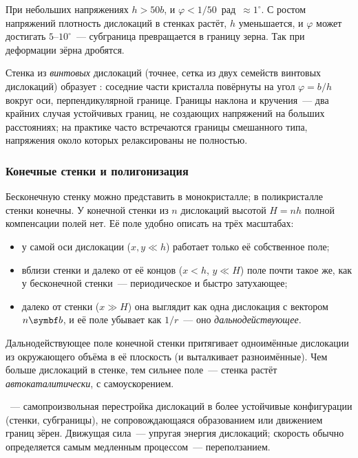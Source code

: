 При небольших напряжениях $h>50b$, и $\varphi<1/50$~рад~$\approx1^\circ$.
С ростом напряжений плотность дислокаций в стенках растёт, $h$
уменьшается, и $\varphi$ может достигать $5$--$10^\circ$~— субграница
превращается в границу зерна. Так при деформации зёрна дробятся.

Стенка из \emph{винтовых} дислокаций (точнее, сетка из двух семейств
винтовых дислокаций) образует : соседние части
кристалла повёрнуты на угол $\varphi=b/h$ вокруг оси, перпендикулярной
границе. Границы наклона и кручения~— два крайних случая устойчивых
границ, не создающих напряжений на больших расстояниях; на практике часто
встречаются границы смешанного типа, напряжения около которых
релаксированы не полностью.

\subsubsection{Конечные стенки и полигонизация}

Бесконечную стенку можно представить в монокристалле; в поликристалле
стенки конечны. У конечной стенки из $n$ дислокаций высотой $H=nh$
полной компенсации полей нет. Её поле удобно описать на трёх масштабах:
\begin{itemize}
\item у самой оси дислокации ($x,y\ll h$) работает только её собственное
поле;
\item вблизи стенки и далеко от её концов ($x<h$, $y\ll H$) поле почти
такое же, как у бесконечной стенки~— периодическое и быстро затухающее;
\item далеко от стенки ($x\gg H$) она выглядит как одна дислокация с
вектором $n\vb b$, и её поле убывает как $1/r$~— оно \emph{дальнодействующее}.
\end{itemize}

Дальнодействующее поле конечной стенки притягивает одноимённые
дислокации из окружающего объёма в её плоскость (и выталкивает
разноимённые). Чем больше дислокаций в стенке, тем сильнее поле~— стенка
растёт \emph{автокаталитически}, с самоускорением.

\begin{opredelenie}
~— самопроизвольная перестройка дислокаций в более
устойчивые конфигурации (стенки, субграницы), не сопровождающаяся
образованием или движением границ зёрен. Движущая сила~— упругая энергия
дислокаций; скорость обычно определяется самым медленным процессом~—
переползанием.
\end{opredelenie}

